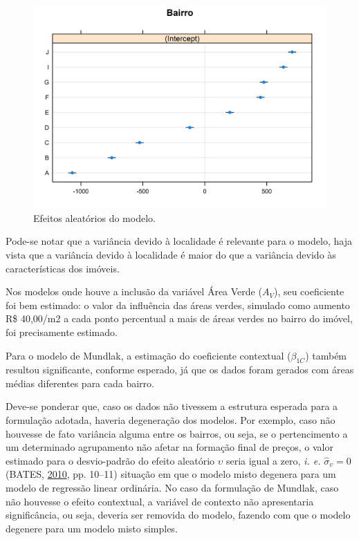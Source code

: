 \documentclass[
  a4paper, 11pt]{article}
\begin{document}
\begin{figure}[H]

{\centering \includegraphics[width=0.7\linewidth]{images/dotplot-1} 

}

\caption{Efeitos aleatórios do modelo.}\label{fig:dotplot}
\end{figure}

Pode-se notar que a variância devido à localidade é relevante para o
modelo, haja vista que a variância devido à localidade é maior do que a
variância devido às características dos imóveis.

Nos modelos onde houve a inclusão da variável Área Verde (\(A_V\)), seu
coeficiente foi bem estimado: o valor da influência das áreas verdes,
simulado como aumento R\$ 40,00/m2 a cada ponto percentual a mais de
áreas verdes no bairro do imóvel, foi precisamente estimado.

Para o modelo de Mundlak, a estimação do coeficiente contextual
(\(\beta_{1C}\)) também resultou significante, conforme esperado, já que
os dados foram gerados com áreas médias diferentes para cada bairro.

Deve-se ponderar que, caso os dados não tivessem a estrutura esperada
para a formulação adotada, haveria degeneração dos modelos. Por exemplo,
caso não houvesse de fato variância alguma entre os bairros, ou seja, se
o pertencimento a um determinado agrupamento não afetar na formação
final de preços, o valor estimado para o desvio-padrão do efeito
aleatório \(\upsilon\) seria igual a zero, \emph{i. e.}
\(\hat \sigma_\upsilon = 0\) (BATES,
\protect\hyperlink{ref-Batesbook}{2010}, pp. 10--11) situação em que o
modelo misto degenera para um modelo de regressão linear ordinária. No
caso da formulação de Mundlak, caso não houvesse o efeito contextual, a
variável de contexto não apresentaria significância, ou seja, deveria
ser removida do modelo, fazendo com que o modelo degenere para um modelo
misto simples.
\end{document}
